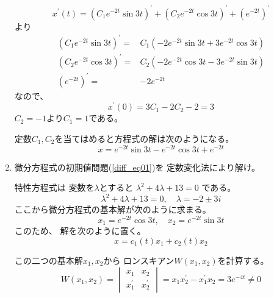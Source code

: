 \documentclass[12pt,b5paper]{ltjsarticle}
\begin{document}
\begin{enumerate}
      \begin{equation}
       x^{\prime}(t)
       =  (C_1 e^{- 2t} \sin{3t})^{\prime}
       + (C_2 e^{- 2t} \cos{3t})^{\prime}
       + (e^{-2t})^{\prime}
      \end{equation}
      より
      \begin{align}
       (C_1 e^{- 2t} \sin{3t})^{\prime}
       =& C_1( -2e^{-2t} \sin 3t +3 e^{-2t} \cos 3t )\\
       (C_2 e^{- 2t} \cos{3t})^{\prime}
       =& C_2( -2e^{-2t} \cos 3t - 3e^{-2t} \sin 3t)\\
       (e^{-2t})^{\prime}
       =& -2 e^{-2t}
      \end{align}
      なので、
      \begin{equation}
       x^{\prime}(0)
       =  3C_1 -2C_2 -2 =3
      \end{equation}
      $C_2=-1$より$C_1=1$である。

      定数$C_1,C_2$を当てはめると方程式の解は次のようになる。
      \begin{equation}
       x = e^{- 2t} \sin{3t} - e^{- 2t} \cos{3t} + e^{-2t}
      \end{equation}

      \hrulefill

 \item
      微分方程式の初期値問題(\ref{diff_eq01})を
      定数変化法により解け。

      \dotfill

      特性方程式は
      変数を$\lambda$とすると
      $\lambda^2+4\lambda+13 = 0$
      である。
      \begin{equation}
       \lambda^2+4\lambda+13 = 0
        ,\quad
        \lambda
        = - 2 \pm 3i
      \end{equation}
      ここから微分方程式の基本解が次のように求まる。
      \begin{equation}
       x_1 = e^{- 2t} \cos{3t}
        ,\quad
       x_2 = e^{- 2t} \sin{3t}
      \end{equation}
      このため、
      解を次のように置く。
      \begin{equation}
       x=c_1(t)x_1 + c_2(t)x_2
        \label{sol_1st}
      \end{equation}

      この二つの基本解$x_1,x_2$から
      ロンスキアン$W(x_1,x_2)$を計算する。
       \begin{equation}
        W(x_1,x_2)
        =
        \begin{vmatrix}
         x_1 & x_2\\
         x_1^{\prime} & x_2^{\prime}
        \end{vmatrix}
        = x_1x_2^{\prime} - x_1^{\prime}x_2
        = 3e^{-4t}
        \ne 0
       \end{equation}


\end{enumerate}
\end{document}
